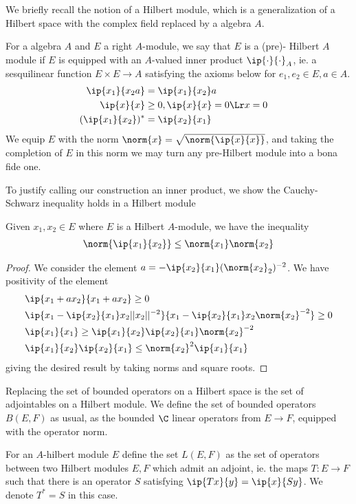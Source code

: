 We briefly recall the notion of a Hilbert \Cstar module, which is a generalization of a Hilbert space with the complex field replaced by a \Cstar algebra $A$.
\begin{definition}
	For a \Cstar algebra $A$ and $E$ a right $A$-module, we say that $E$ is a (pre)- Hilbert $A$ module if $E$ is equipped with an $A$-valued inner product $\ip{\cdot}{\cdot}_A$, ie. a sesquilinear function $E\times E\to A$ satisfying the axioms below for $e_1,e_2\in E,a\in A$. 
	\begin{align*}
		\ip{x_1}{x_2a}&=\ip{x_1}{x_2}a & \\
		\ip{x}{x}&\geq 0,\ip{x}{x}=0 \Lr x=0 \\
		(\ip{x_1}{x_2})^*&=\ip{x_2}{x_1}
	\end{align*}
	We equip $E$ with the norm $\norm{x}=\sqrt{\norm{\ip{x}{x}}}$, and taking the completion of $E$ in this norm we may turn any pre-Hilbert module into a bona fide one. 
\end{definition}
To justify calling our construction an inner product, we show the Cauchy-Schwarz inequality holds in a Hilbert module
\begin{lemma}
	Given $x_1,x_2\in E$ where $E$ is a Hilbert $A$-module, we have the inequality 
	\begin{align*}
		\norm{\ip{x_1}{x_2}}\leq \norm{x_1} \norm{x_2}
	\end{align*}
\end{lemma}
\begin{proof}
	We consider the element $a=-\ip{x_2}{x_1}(\norm{x_2}_2)^{-2}$. We have positivity of the element 
	\begin{align*}
		&\ip{x_1+ax_2}{x_1+ax_2}\geq 0 \\
		&\ip{x_1-\ip{x_2}{x_1}x_2||x_2||^{-2}}{x_1-\ip{x_2}{x_1}x_2\norm{x_2}^{-2}}\geq 0 \\
		&\ip{x_1}{x_1}\geq \ip{x_1}{x_2}\ip{x_2}{x_1}\norm{x_2}^{-2}\\
		&\ip{x_1}{x_2}\ip{x_2}{x_1}\leq \norm{x_2}^2 \ip{x_1}{x_1}
	\end{align*}
	giving the desired result by taking norms and square roots. 
\end{proof}
Replacing the set of bounded operators on a Hilbert space is the set of adjointables on a Hilbert module. We define the set of bounded operators $B(E,F)$ as usual, as the bounded $\C$ linear operators from $E\to F$, equipped with the operator norm. 
\begin{definition}
	For an $A$-hilbert module $E$ define the set $L(E,F)$ as the set of operators between two Hilbert modules $E,F$ which admit an adjoint, ie. the maps $T: E\to F$ such that there is an operator $S$ satisfying $\ip{Tx}{y}=\ip{x}{Sy}$. We denote $T^*=S$ in this case. 
\end{definition}
